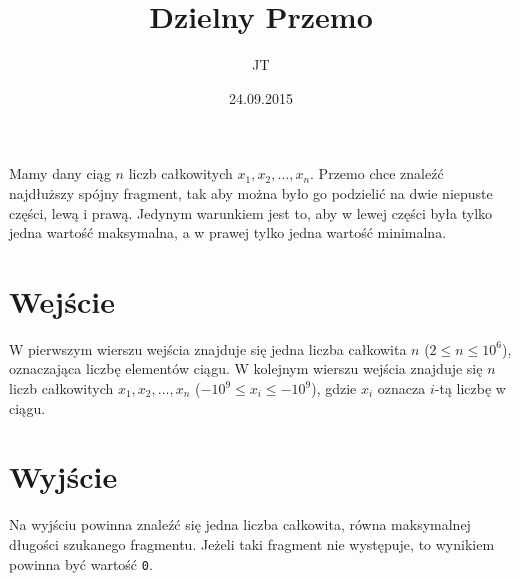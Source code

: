 \documentclass[zad,zawodnik,utf8]{sinol}
\title{Dzielny Przemo}
\author{JT} %
\date{24.09.2015}
\begin{document}
\begin{tasktext}%
Mamy dany ciąg $n$ liczb całkowitych $x_1, x_2, \ldots, x_n$.
Przemo chce znaleźć najdłuższy spójny fragment, tak aby można było go podzielić na dwie niepuste części,
lewą i prawą. Jedynym warunkiem jest to, aby w lewej części była tylko jedna wartość maksymalna, a w prawej tylko jedna wartość minimalna.

  \section{Wejście}
W pierwszym wierszu wejścia znajduje się jedna liczba całkowita $n$ ($2 \leq n \leq 10^6$),
oznaczająca liczbę elementów ciągu.
W kolejnym wierszu wejścia znajduje się $n$ liczb całkowitych $x_1, x_2, \ldots, x_n$ ($-10^9 \leq x_i \leq -10^9$), gdzie $x_i$ oznacza $i$-tą liczbę w ciągu.

  \section{Wyjście}
Na wyjściu powinna znaleźć się jedna liczba całkowita, równa maksymalnej długości szukanego fragmentu.
Jeżeli taki fragment nie występuje, to wynikiem powinna być wartość \texttt{0}.

\makecompactexample    

\end{tasktext}
\end{document}
